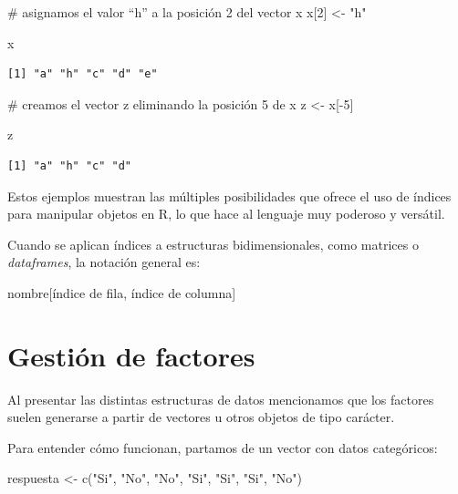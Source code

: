 \documentclass[
  spanish,
  a4paper,
]{scrbook}
\newenvironment{Shaded}{\begin{snugshade}}{\end{snugshade}}
\newcommand{\CommentTok}[1]{\textcolor[rgb]{0.37,0.37,0.37}{#1}}
\newcommand{\DecValTok}[1]{\textcolor[rgb]{0.68,0.00,0.00}{#1}}
\newcommand{\FunctionTok}[1]{\textcolor[rgb]{0.28,0.35,0.67}{#1}}
\newcommand{\NormalTok}[1]{\textcolor[rgb]{0.00,0.23,0.31}{#1}}
\newcommand{\OtherTok}[1]{\textcolor[rgb]{0.00,0.23,0.31}{#1}}
\newcommand{\SpecialCharTok}[1]{\textcolor[rgb]{0.37,0.37,0.37}{#1}}
\newcommand{\StringTok}[1]{\textcolor[rgb]{0.13,0.47,0.30}{#1}}
\begin{document}
\begin{Shaded}
\begin{Highlighting}[]
\CommentTok{\# asignamos el valor “h” a la posición 2 del vector x}
\NormalTok{x[}\DecValTok{2}\NormalTok{] }\OtherTok{\textless{}{-}} \StringTok{"h"}

\NormalTok{x}
\end{Highlighting}
\end{Shaded}

\begin{verbatim}
[1] "a" "h" "c" "d" "e"
\end{verbatim}

\begin{Shaded}
\begin{Highlighting}[]
\CommentTok{\# creamos el vector z eliminando la posición 5 de x}
\NormalTok{z }\OtherTok{\textless{}{-}}\NormalTok{ x[}\SpecialCharTok{{-}}\DecValTok{5}\NormalTok{]}

\NormalTok{z}
\end{Highlighting}
\end{Shaded}

\begin{verbatim}
[1] "a" "h" "c" "d"
\end{verbatim}

Estos ejemplos muestran las múltiples posibilidades que ofrece el uso de
índices para manipular objetos en R, lo que hace al lenguaje muy
poderoso y versátil.

Cuando se aplican índices a estructuras bidimensionales, como matrices o
\emph{dataframes}, la notación general es:

\begin{Shaded}
\begin{Highlighting}[]
\NormalTok{nombre[índice de fila, índice de columna]}
\end{Highlighting}
\end{Shaded}

\section{Gestión de factores}\label{gestiuxf3n-de-factores}

Al presentar las distintas estructuras de datos mencionamos que los
factores suelen generarse a partir de vectores u otros objetos de tipo
carácter.

Para entender cómo funcionan, partamos de un vector con datos
categóricos:

\begin{Shaded}
\begin{Highlighting}[]
\NormalTok{respuesta }\OtherTok{\textless{}{-}} \FunctionTok{c}\NormalTok{(}\StringTok{"Si"}\NormalTok{, }\StringTok{"No"}\NormalTok{, }\StringTok{"No"}\NormalTok{, }\StringTok{"Si"}\NormalTok{, }\StringTok{"Si"}\NormalTok{, }\StringTok{"Si"}\NormalTok{, }\StringTok{"No"}\NormalTok{)}
\end{Highlighting}
\end{Shaded}
\end{document}
